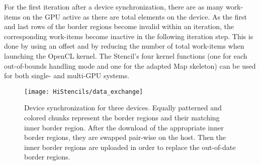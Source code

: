 For the first iteration after a device synchronization, there are as many work-items on the GPU active as there are total elements on the device.
As the first and last rows of the border regions become invalid within an iteration, the corresponding work-items become inactive in the following iteration step.
This is done by using an offset and by reducing the number of total work-items when launching the OpenCL kernel.
The Stencil's four kernel functions (one for each out-of-bounds handling mode and one for the adapted Map skeleton) can be used for both single- and multi-GPU systems.
 
\begin{figure}[tb]
	\centering
	\texttt{[image: HiStencils/data\_exchange]}
	\caption{\small Device synchronization for three devices. Equally patterned and colored chunks represent the border regions and their matching inner border region. After the download of the appropriate inner border regions, they are swapped pair-wise on the host. Then the inner border regions are uploaded in order to replace the out-of-date border regions.}
	\label{fig:syncDevices}
  \vspace{1em}
\end{figure} 

